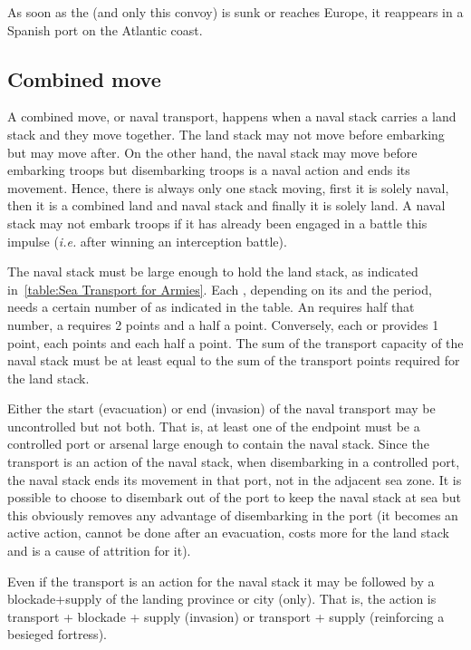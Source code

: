  \label{chMilitary:FlotaDeOroMovement} As soon as the
 (and only this convoy) is sunk or reaches Europe, it
reappears in a Spanish port on the Atlantic coast.

\subsection{Combined move}
A combined move, or naval transport, happens when a naval stack carries a land
stack and they move together. The land stack may not move before embarking but
may move after. On the other hand, the naval stack may move before embarking
troops but disembarking troops is a naval action and ends its movement. Hence,
there is always only one stack moving, first it is solely naval, then it is a
combined land and naval stack and finally it is solely land. A naval stack may
not embark troops if it has already been engaged in a battle this impulse
(\emph{i.e.} after winning an interception battle).

The naval stack must be large enough to hold the land stack, as indicated
in~\ref{table:Sea Transport for Armies}. Each \ARMY\Faceplus, depending on its
 and the period, needs a certain number of  as indicated in the table. An \ARMY\Facemoins requires half that
number, a \LD requires 2 points and a \LDE half a point. Conversely, each \NWD
or \NGD provides 1 point, each  points and each \NDE half a point. The
sum of the transport capacity of the naval stack must be at least equal to the
sum of the transport points required for the land stack.


Either the start (evacuation) or end (invasion) of the naval transport may be
uncontrolled but not both. That is, at least one of the endpoint must be a
controlled port or arsenal large enough to contain the naval stack. Since the
transport is an action of the naval stack, when disembarking in a controlled
port, the naval stack ends its movement in that port, not in the adjacent sea
zone. It is possible to choose to disembark out of the port to keep the naval
stack at sea but this obviously removes any advantage of disembarking in the
port (it becomes an active action, cannot be done after an evacuation, costs
more \MP for the land stack and is a cause of attrition for it).

Even if the transport is an action for the naval stack it may be followed by a
blockade+supply of the landing province or city (only). That is, the action is
transport + blockade + supply (invasion) or transport + supply (reinforcing a
besieged fortress).

